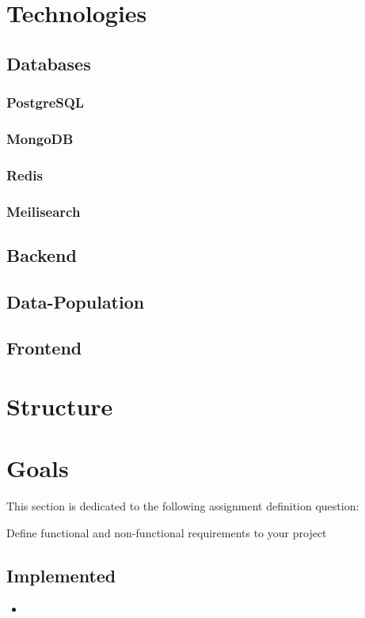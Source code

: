 \documentclass[a4paper, 12pt]{article}
\begin{document}
\section{Technologies}

\subsection{Databases}

\subsubsection{PostgreSQL}
\subsubsection{MongoDB}
\subsubsection{Redis}
\subsubsection{Meilisearch}

\subsection{Backend}
\subsection{Data-Population}
\subsection{Frontend}

\section{Structure}


\section{Goals}
This section is dedicated to the following assignment definition question:

Define functional and non-functional requirements to your project

\subsection{Implemented}
\begin{itemize}
	\item
\end{itemize}
\end{document}
